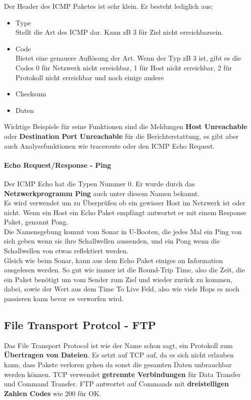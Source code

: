 \documentclass[12pt,a4paper]{report}
\begin{document}
Der Header des ICMP Paketes ist sehr klein. Er besteht lediglich aus:
\begin{itemize}
\item Type\\
Stellt die Art des ICMP dar. Kann zB 3 für \glqq Ziel nicht erreichbar\grqq  sein.
\item Code\\
Bietet eine genauere Auflösung der Art. Wenn der Typ zB 3 ist, gibt es die Codes 0 für Netzwerk nicht erreichbar, 1 für Host nicht erreichbar, 2 für Protokoll nicht erreichbar und noch einige andere
\item Checksum
\item Daten
\end{itemize}

Wichtige Beispiele für seine Funktionen sind die Meldungen \textbf{Host Unreachable} oder \textbf{Destination Port Unreachable} für die Berichterstattung, es gibt aber auch Analysefunktionen wie traceroute oder den ICMP Echo Request. 
\paragraph{Echo Request/Response - Ping}
Der ICMP Echo hat die Typen Nummer 0. Er wurde durch das \textbf{Netzwerkprogramm Ping} auch unter diesem Namen bekannt.\\
Es wird verwendet um zu Überprüfen ob ein gewisser Host im Netzwerk ist oder nicht. Wenn ein Host ein Echo Paket empfängt antwortet er mit einem Response Paket, genannt Pong.\\

Die Namensgebung kommt vom Sonar in U-Booten, die jedes Mal ein Ping von sich geben wenn sie ihre Schallwellen aussenden, und ein Pong wenn die Schallwellen von etwas reflektiert werden.\\ 
Gleich wie beim Sonar, kann aus dem Echo Paket einiges an Information ausgelesen werden. So gut wie immer ist die Round-Trip Time, also die Zeit, die ein Paket benötigt um vom Sender zum Ziel und wieder zurück zu kommen, dabei, sowie der Wert aus dem Time To Live Feld, also wie viele Hops es noch passieren kann bevor es verworfen wird.
\subsection{File Transport Protcol - FTP}
Das File Transport Protocol ist wie der Name schon sagt, ein Protokoll zum \textbf{Übertragen von Dateien}. Es setzt auf TCP auf, da es sich nicht erlauben kann, dass Pakete verloren gehen da sonst die gesamten Daten unbrauchbar werden können. TCP verwendet \textbf{getrennte Verbindungen} für Data Transfer und Command Transfer. FTP antwortet auf Commands mit \textbf{dreistelligen Zahlen Codes} wie 200 für OK.\\
\end{document}
